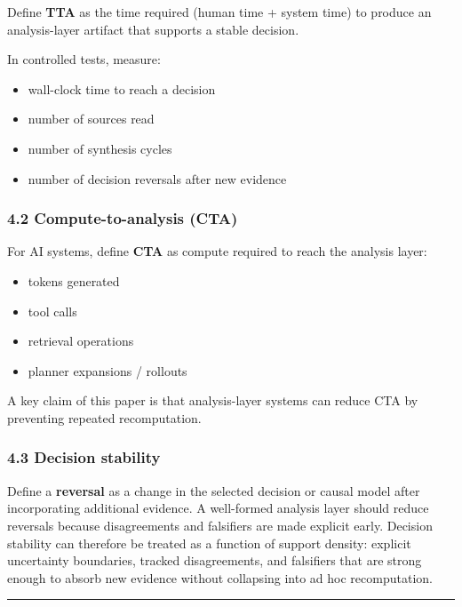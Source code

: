 \documentclass[11pt]{article}
\providecommand{\tightlist}{%
  \setlength{\itemsep}{0pt}\setlength{\parskip}{0pt}}
\begin{document}
Define \textbf{TTA} as the time required (human time + system time) to
produce an analysis-layer artifact that supports a stable decision.

In controlled tests, measure:

\begin{itemize}
\tightlist
\item
  wall-clock time to reach a decision
\item
  number of sources read
\item
  number of synthesis cycles
\item
  number of decision reversals after new evidence
\end{itemize}

\hypertarget{compute-to-analysis-cta}{%
\subsubsection{4.2 Compute-to-analysis
(CTA)}\label{compute-to-analysis-cta}}

For AI systems, define \textbf{CTA} as compute required to reach the
analysis layer:

\begin{itemize}
\tightlist
\item
  tokens generated
\item
  tool calls
\item
  retrieval operations
\item
  planner expansions / rollouts
\end{itemize}

A key claim of this paper is that analysis-layer systems can reduce CTA
by preventing repeated recomputation.

\hypertarget{decision-stability}{%
\subsubsection{4.3 Decision stability}\label{decision-stability}}

Define a \textbf{reversal} as a change in the selected decision or
causal model after incorporating additional evidence. A well-formed
analysis layer should reduce reversals because disagreements and
falsifiers are made explicit early.
Decision stability can therefore be treated as a function of support
density: explicit uncertainty boundaries, tracked disagreements, and
falsifiers that are strong enough to absorb new evidence without
collapsing into ad hoc recomputation.

\begin{center}\rule{0.5\linewidth}{0.5pt}\end{center}
\end{document}
